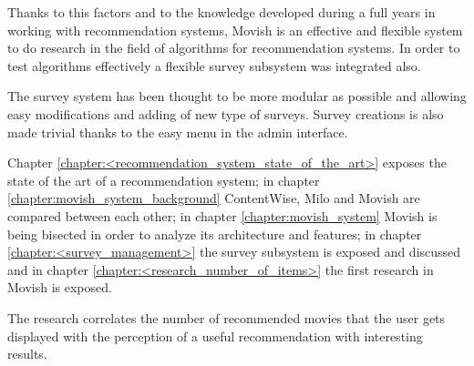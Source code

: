 Thanks to this factors and to the knowledge developed during a full years in working with recommendation systems, Movish is an effective and flexible system to do research in the field of algorithms for recommendation systems. In order to test algorithms effectively a flexible survey subsystem was integrated also. 

The survey system has been thought to be more modular as possible and allowing easy modifications and adding of new type of surveys. Survey creations is also made trivial thanks to the easy menu in the admin interface.

Chapter \ref{chapter:<recommendation_system_state_of_the_art>} exposes the state of the art of a recommendation system; in chapter \ref{chapter:movish_system_background} ContentWise, Milo and Movish are compared between each other; in chapter \ref{chapter:movish_system} Movish is being bisected in order to analyze its architecture and features; in chapter \ref{chapter:<survey_management>} the survey subsystem is exposed and discussed and in chapter \ref{chapter:<research_number_of_items>} the first research in Movish is exposed.

The research correlates the number of recommended movies that the user gets displayed with the perception of a useful recommendation with interesting results.
